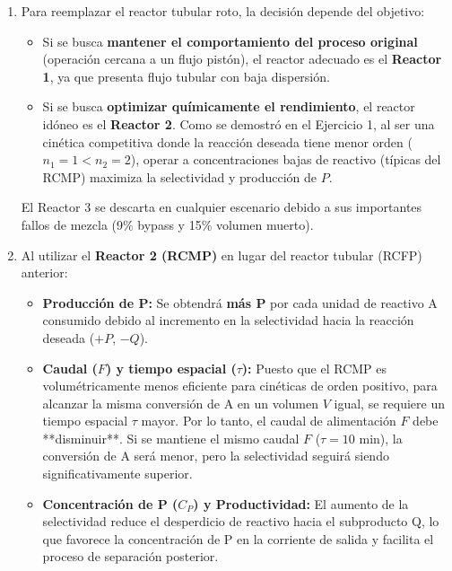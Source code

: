 \begin{enumerate}[label={\alph*)}]
	\item Para reemplazar el reactor tubular roto, la decisión depende del objetivo:
	      \begin{itemize}
		      \item Si se busca \textbf{mantener el comportamiento del proceso original} (operación cercana a un flujo pistón), el reactor adecuado es el \textbf{Reactor 1}, ya que presenta flujo tubular con baja dispersión.
		      \item Si se busca \textbf{optimizar químicamente el rendimiento}, el reactor idóneo es el \textbf{Reactor 2}. Como se demostró en el Ejercicio 1, al ser una cinética competitiva donde la reacción deseada tiene menor orden ($n_1 = 1 < n_2 = 2$), operar a concentraciones bajas de reactivo (típicas del RCMP) maximiza la selectividad y producción de $P$.
	      \end{itemize}
	      El Reactor 3 se descarta en cualquier escenario debido a sus importantes fallos de mezcla (9\% bypass y 15\% volumen muerto).
	      \begin{center}
	      \end{center}

	\item Al utilizar el \textbf{Reactor 2 (RCMP)} en lugar del reactor tubular (RCFP) anterior:
	      \begin{itemize}
		      \item \textbf{Producción de P:} Se obtendrá \textbf{más P} por cada unidad de reactivo A consumido debido al incremento en la selectividad hacia la reacción deseada ($+P$, $-Q$).
		      \item \textbf{Caudal ($F$) y tiempo espacial ($\tau$):} Puesto que el RCMP es volumétricamente menos eficiente para cinéticas de orden positivo, para alcanzar la misma conversión de A en un volumen $V$ igual, se requiere un tiempo espacial $\tau$ mayor. Por lo tanto, el caudal de alimentación $F$ debe **disminuir**. Si se mantiene el mismo caudal $F$ ($\tau = 10$ min), la conversión de A será menor, pero la selectividad seguirá siendo significativamente superior.
		      \item \textbf{Concentración de P ($C_P$) y Productividad:} El aumento de la selectividad reduce el desperdicio de reactivo hacia el subproducto Q, lo que favorece la concentración de P en la corriente de salida y facilita el proceso de separación posterior.
	      \end{itemize}


\end{enumerate}

